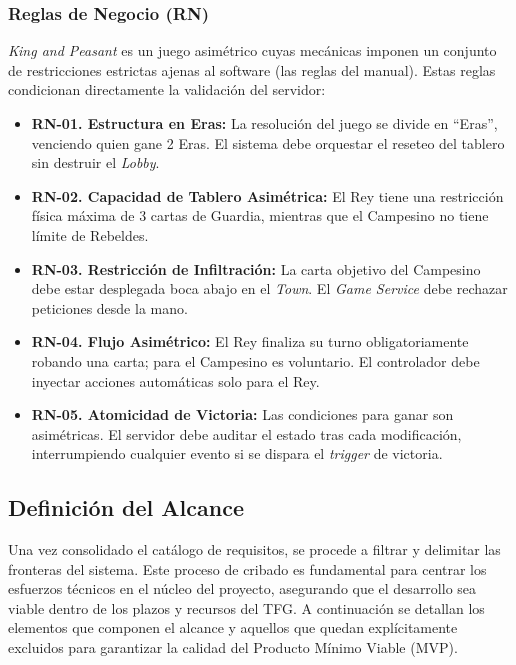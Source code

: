 \subsubsection{Reglas de Negocio (RN)}
\textit{King and Peasant} es un juego asimétrico cuyas mecánicas imponen un conjunto de restricciones estrictas ajenas al software (las reglas del manual). Estas reglas condicionan directamente la validación del servidor:
\begin{itemize}
    \item \textbf{RN-01. Estructura en Eras:} La resolución del juego se divide en ``Eras'', venciendo quien gane 2 Eras. El sistema debe orquestar el reseteo del tablero sin destruir el \textit{Lobby}.
    \item \textbf{RN-02. Capacidad de Tablero Asimétrica:} El Rey tiene una restricción física máxima de 3 cartas de Guardia, mientras que el Campesino no tiene límite de Rebeldes.
    \item \textbf{RN-03. Restricción de Infiltración:} La carta objetivo del Campesino debe estar desplegada boca abajo en el \textit{Town}. El \textit{Game Service} debe rechazar peticiones desde la mano.
    \item \textbf{RN-04. Flujo Asimétrico:} El Rey finaliza su turno obligatoriamente robando una carta; para el Campesino es voluntario. El controlador debe inyectar acciones automáticas solo para el Rey.
    \item \textbf{RN-05. Atomicidad de Victoria:} Las condiciones para ganar son asimétricas. El servidor debe auditar el estado tras cada modificación, interrumpiendo cualquier evento si se dispara el \textit{trigger} de victoria.
\end{itemize}

\subsection{Definición del Alcance}

Una vez consolidado el catálogo de requisitos, se procede a filtrar y delimitar las fronteras del sistema. Este proceso de cribado es fundamental para centrar los esfuerzos técnicos en el núcleo del proyecto, asegurando que el desarrollo sea viable dentro de los plazos y recursos del TFG. A continuación se detallan los elementos que componen el alcance y aquellos que quedan explícitamente excluidos para garantizar la calidad del Producto Mínimo Viable (MVP).


